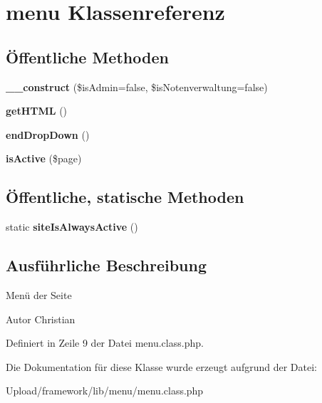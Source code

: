 \hypertarget{classmenu}{}\section{menu Klassenreferenz}
\label{classmenu}
\subsection*{Öffentliche Methoden}
\begin{DoxyCompactItemize}
\item 
\mbox{\label{classmenu_a1447fd8a7a7a74f64368a2c4e4c69e78}} 
{\bfseries \+\_\+\+\_\+construct} (\$is\+Admin=false, \$is\+Notenverwaltung=false)
\item 
\mbox{\label{classmenu_ac5bd04547249fbf0481bb87fd2da3997}} 
{\bfseries get\+H\+T\+ML} ()
\item 
\mbox{\label{classmenu_a4aa993d8c5628d53126d0ad5094e78a5}} 
{\bfseries end\+Drop\+Down} ()
\item 
\mbox{\label{classmenu_ad220968f46f84f6806fd2644f2ef8a18}} 
{\bfseries is\+Active} (\$page)
\end{DoxyCompactItemize}
\subsection*{Öffentliche, statische Methoden}
\begin{DoxyCompactItemize}
\item 
\mbox{\label{classmenu_a2cfb788a44457aac72345cb5eba400c4}} 
static {\bfseries site\+Is\+Always\+Active} ()
\end{DoxyCompactItemize}


\subsection{Ausführliche Beschreibung}
Menü der Seite \begin{DoxyAuthor}{Autor}
Christian 
\end{DoxyAuthor}


Definiert in Zeile 9 der Datei menu.\+class.\+php.



Die Dokumentation für diese Klasse wurde erzeugt aufgrund der Datei\+:\begin{DoxyCompactItemize}
\item 
Upload/framework/lib/menu/menu.\+class.\+php\end{DoxyCompactItemize}
